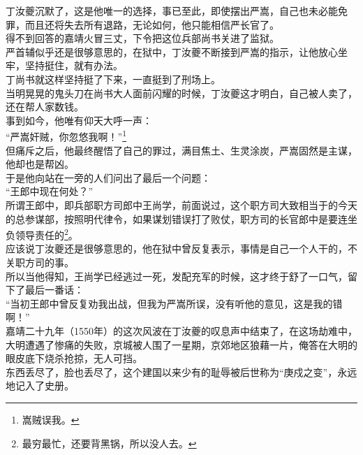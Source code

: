 \begin{multicols}{\theparacolNo}
丁汝夔沉默了，这是他唯一的选择，事已至此，即使摆出严嵩，自己也未必能免罪，而且还将失去所有退路，无论如何，他只能相信严长官了。\\

得不到回答的嘉靖火冒三丈，下令把这位兵部尚书关进了监狱。\\

严首辅似乎还是很够意思的，在狱中，丁汝夔不断接到严嵩的指示，让他放心坐牢，坚持挺住，就有办法。\\

丁尚书就这样坚持挺了下来，一直挺到了刑场上。\\

当明晃晃的鬼头刀在尚书大人面前闪耀的时候，丁汝夔这才明白，自己被人卖了，还在帮人家数钱。\\

事到如今，他唯有仰天大呼一声：\\

“严嵩奸贼，你忽悠我啊！”\footnote{嵩贼误我。}\\

但痛斥之后，他最终醒悟了自己的罪过，满目焦土、生灵涂炭，严嵩固然是主谋，他却也是帮凶。\\

于是他向站在一旁的人们问出了最后一个问题：\\

“王郎中现在何处？”\\

所谓王郎中，即兵部职方司郎中王尚学，前面说过，这个职方司大致相当于的今天的总参谋部，按照明代律令，如果谋划错误打了败仗，职方司的长官郎中是要连坐负领导责任的\footnote{最穷最忙，还要背黑锅，所以没人去。}。\\

应该说丁汝夔还是很够意思的，他在狱中曾反复表示，事情是自己一个人干的，不关职方司的事。\\

所以当他得知，王尚学已经逃过一死，发配充军的时候，这才终于舒了一口气，留下了最后一番话：\\

“当初王郎中曾反复劝我出战，但我为严嵩所误，没有听他的意见，这是我的错啊！”\\

嘉靖二十九年（1550年）的这次风波在丁汝夔的叹息声中结束了，在这场劫难中，大明遭遇了惨痛的失败，京城被人围了一星期，京郊地区狼藉一片，俺答在大明的眼皮底下烧杀抢掠，无人可挡。\\

东西丢尽了，脸也丢尽了，这个建国以来少有的耻辱被后世称为“庚戍之变”，永远地记入了史册。\\


\end{multicols}
